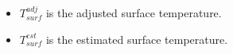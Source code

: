 \documentclass{article}
\begin{document}
\begin{itemize}[noitemsep]
  \item $T_{surf}^{adj}$ is the adjusted surface temperature.
  \item $T_{surf}^{est}$ is the estimated surface temperature.
\end{itemize}

\end{document}
